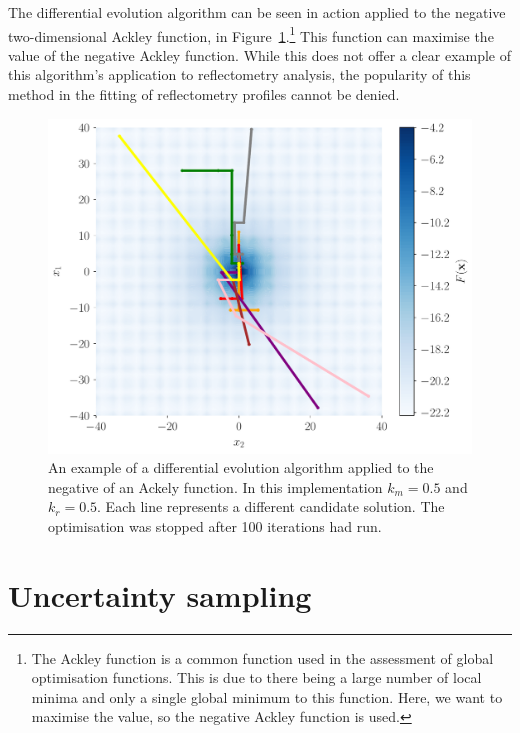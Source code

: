\documentclass[twoside,symmetric]{tufte-handout}
\begin{document}
The differential evolution algorithm can be seen in action applied to the negative two-dimensional Ackley function,\cite{ackley_connectionist_1987} in Figure~\ref{fig:ackley}.\footnote{The Ackley function is a common function used in the assessment of global optimisation functions. This is due to there being a large number of local minima and only a single global minimum to this function. Here, we want to maximise the value, so the negative Ackley function is used.}
This function can maximise the value of the negative Ackley function.
While this does not offer a clear example of this algorithm's application to reflectometry analysis, the popularity of this method in the fitting of reflectometry profiles cannot be denied.\cite{bjorck_fitting_2011,nelson_refnx_2019} 
%
\begin{figure}
    \forcerectofloat
    \includegraphics[width=\textwidth]{ackley}
    \caption{An example of a differential evolution algorithm applied to the negative of an Ackely function. In this implementation $k_m=0.5$ and $k_r=0.5$. Each line represents a different candidate solution. The optimisation was stopped after 100 iterations had run.}
    \label{fig:ackley}
\end{figure}
%

\section{Uncertainty sampling}
\end{document}
